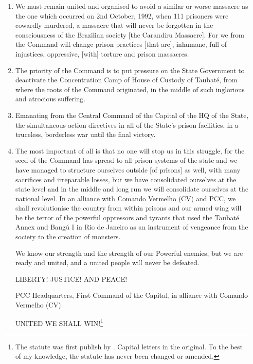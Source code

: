 \begin{enumerate}
\item We must remain united and organised to avoid a similar or worse massacre as the one which occurred on 2nd October, 1992, when 111 prisoners were cowardly murdered, a massacre that will never be forgotten in the consciousness of the Brazilian society [the Carandiru Massacre]. For we from the Command will change prison practices [that are], inhumane, full of injustices, oppressive, [with] torture and prison massacres.
\item The priority of the Command is to put pressure on the State Government to deactivate the Concentration Camp of House of Custody of Taubat\'{e}, from where the roots of the Command originated, in the middle of such inglorious and atrocious suffering.
\item Emanating from the Central Command of the Capital of the HQ of the State, the simultaneous action directives in all of the State's prison facilities, in a truceless, borderless war until the final victory.
\item The most important of all is that no one will stop us in this struggle, for the seed of the Command has spread to all prison systems of the state and we have managed to structure ourselves outside [of prisons] as well, with many sacrifices and irreparable losses, but we have consolidated ourselves at the state level and in the middle and long run we will consolidate ourselves at the national level. In an alliance with Comando Vermelho (CV) and PCC, we shall revolutionise the country from within prisons and our armed wing will be the terror of the powerful oppressors and tyrants that used the Taubat\'{e} Annex and Bang\'{u} I in Rio de Janeiro as an instrument of vengeance from the society to the creation of monsters.

\vspace{.3cm}

We know our strength and the strength of our Powerful enemies, but we are ready and united, and a united people will never be defeated.

\vspace{.3cm}

LIBERTY! JUSTICE! AND PEACE!

\vspace{.3cm}

PCC Headquarters, First Command of the Capital, in alliance with Comando Vermelho (CV)

\vspace{.3cm}

UNITED WE SHALL WIN!\footnote{The statute was first publish by \citet{folha2001estatutopcc}. Capital letters in the original. To the best of my knowledge, the statute has never been changed or amended.}
\end{enumerate}

